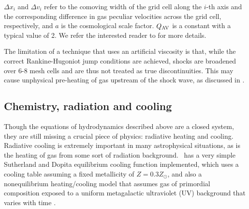 $\Delta x_i$ and $\Delta v_{i}$ refer to the comoving 
width of the grid cell
along the $i$-th axis and the corresponding difference in gas
peculiar velocities across the grid cell, respectively, and $a$ is the
cosmological scale factor.  $Q_{\rm AV}$ is a constant with a typical
value of 2. We refer the interested reader to \citet{1994ApJ...429..434A} for more details.

The limitation of a technique that uses an artificial viscosity is that,
while the correct Rankine-Hugoniot jump conditions are achieved,
shocks are broadened over 6-8 mesh cells and are thus not treated as true
discontinuities. This may cause unphysical pre-heating of gas upstream
of the shock wave, as discussed in \citet{1994ApJ...429..434A}.

\subsection{Chemistry, radiation and cooling}\label{sec.ov.chem}


Though the equations of hydrodynamics described above are a closed system,
they are still missing a crucial piece of physics: radiative heating and cooling.
Radiative cooling is extremely important in many astrophysical situations, as is 
the heating of gas from some sort of radiation background.  \enzo\ has a very simple
Sutherland and Dopita equilibrium cooling function \citep{1993ApJS...88..253S} 
implemented, which uses a
cooling table assuming a fixed metallicity of $Z = 0.3 Z_\odot$, and also a
nonequilibrium heating/cooling model that assumes gas of primordial composition exposed to a
uniform metagalactic ultraviolet (UV) background that varies with time \citep{1996ApJS..105...19K}.  

